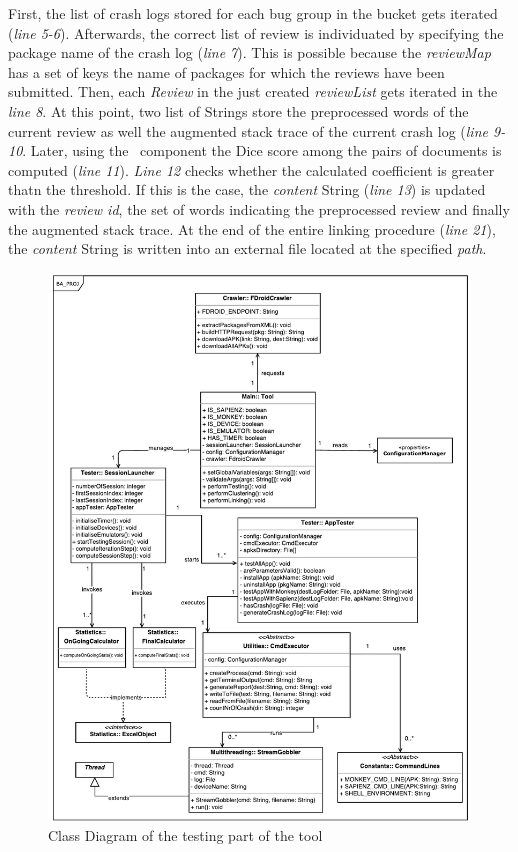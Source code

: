 First, the list of crash logs stored for each bug group in the bucket gets iterated (\textit{line 5-6}). 
Afterwards, the correct list of review is individuated by specifying the package name of the crash log (\textit{line 7}). This is possible because the \textit{reviewMap} has a set of keys the name of packages for which the reviews have been submitted. 
Then, each \textit{Review} in the just created \textit{reviewList} gets iterated in the \textit{line 8}.
At this point, two list of Strings store the preprocessed words of the current review as well the augmented stack trace of the current crash log (\textit{line 9-10}.
Later, using the \Facade\ component the Dice score among the pairs of documents is computed (\textit{line 11}). 
\textit{Line 12} checks whether the calculated coefficient is greater thatn the threshold. 
If this is the case, the \textit{content} String (\textit{line 13}) is updated with 
the \textit{review id}, the set of words indicating the preprocessed review and finally the augmented stack trace. 
At the end of the entire linking procedure (\textit{line 21}), the \textit{content} String is written into an external file located at the specified \textit{path}.

\begin{figure}[tb]
\centering 
\includegraphics[width=\columnwidth]{diagrams/testing.pdf} 
\caption{Class Diagram of the testing part of the tool }
\label{testing}
\vspace{-3mm} 
\end{figure}


